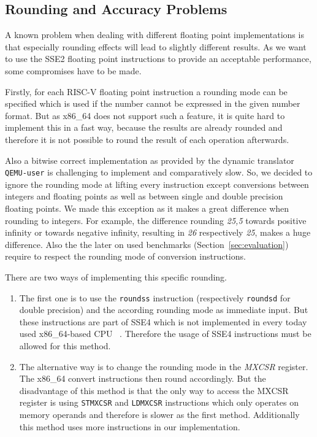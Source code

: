 \documentclass[course=eragp]{aspdoc}
\begin{document}
\subsection{Rounding and Accuracy Problems}

A known problem when dealing with different floating point implementations is that especially
rounding effects will lead to slightly different results. As we want to use the SSE2 floating point
instructions to provide an acceptable performance, some compromises have to be made.

\par

Firstly, for each RISC-V floating point instruction a rounding mode can be specified which is used
if the number cannot be expressed in the given number format. But as x86\_64 does not support such a
feature, it is quite hard to implement this in a fast way, because the results are already rounded
and therefore it is not possible to round the result of each operation afterwards.

\par

Also a bitwise correct implementation as provided by the dynamic translator \texttt{QEMU-user} is
challenging to implement and comparatively slow. So, we decided to ignore the rounding mode at lifting
every instruction except conversions between integers and floating points as well as between single
and double precision floating points. We made this exception as it makes a great difference when
rounding to integers. For example, the difference rounding \emph{25,5} towards positive infinity or
towards negative infinity, resulting in \emph{26} respectively \emph{25}, makes a huge difference.
Also the the later on used benchmarks (Section~\ref{sec:evaluation}) require to respect the rounding mode of
conversion instructions.

\par

There are two ways of implementing this specific rounding.

\begin{enumerate}
    \item The first one is to use the \texttt{roundss} instruction (respectively \texttt{roundsd}
          for double precision) and the according rounding mode as immediate input. But these
          instructions are part of SSE4 which is not implemented in every today used x86\_64-based
          CPU ~\cite{intel2017man}. Therefore the usage of SSE4 instructions must be allowed for this method.

    \item The alternative way is to change the rounding mode in the \emph{MXCSR} register. The
          x86\_64 convert instructions then round accordingly. But the disadvantage of this method
          is that the only way to access the MXCSR register is using \texttt{STMXCSR} and
          \texttt{LDMXCSR} instructions which only operates on memory operands and therefore is
          slower as the first method. Additionally this method uses more instructions in our
          implementation.~\cite{intel2017man}
\end{enumerate}
\end{document}
